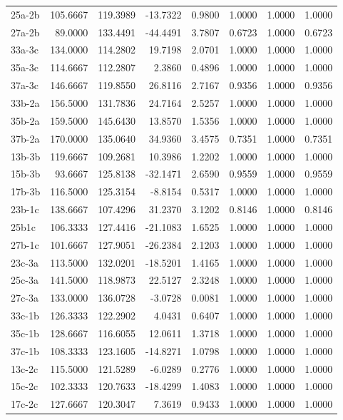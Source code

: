 \begin{table}
\begin{tabular}{lrrrrrrr}
25a-2b & 105.6667 & 119.3989 & -13.7322 & 0.9800 & 1.0000 & 1.0000 & 1.0000 \\
27a-2b & 89.0000 & 133.4491 & -44.4491 & 3.7807 & 0.6723 & 1.0000 & 0.6723 \\
33a-3c & 134.0000 & 114.2802 & 19.7198 & 2.0701 & 1.0000 & 1.0000 & 1.0000 \\
35a-3c & 114.6667 & 112.2807 & 2.3860 & 0.4896 & 1.0000 & 1.0000 & 1.0000 \\
37a-3c & 146.6667 & 119.8550 & 26.8116 & 2.7167 & 0.9356 & 1.0000 & 0.9356 \\
33b-2a & 156.5000 & 131.7836 & 24.7164 & 2.5257 & 1.0000 & 1.0000 & 1.0000 \\
35b-2a & 159.5000 & 145.6430 & 13.8570 & 1.5356 & 1.0000 & 1.0000 & 1.0000 \\
37b-2a & 170.0000 & 135.0640 & 34.9360 & 3.4575 & 0.7351 & 1.0000 & 0.7351 \\
13b-3b & 119.6667 & 109.2681 & 10.3986 & 1.2202 & 1.0000 & 1.0000 & 1.0000 \\
15b-3b & 93.6667 & 125.8138 & -32.1471 & 2.6590 & 0.9559 & 1.0000 & 0.9559 \\
17b-3b & 116.5000 & 125.3154 & -8.8154 & 0.5317 & 1.0000 & 1.0000 & 1.0000 \\
23b-1c & 138.6667 & 107.4296 & 31.2370 & 3.1202 & 0.8146 & 1.0000 & 0.8146 \\
25b1c & 106.3333 & 127.4416 & -21.1083 & 1.6525 & 1.0000 & 1.0000 & 1.0000 \\
27b-1c & 101.6667 & 127.9051 & -26.2384 & 2.1203 & 1.0000 & 1.0000 & 1.0000 \\
23c-3a & 113.5000 & 132.0201 & -18.5201 & 1.4165 & 1.0000 & 1.0000 & 1.0000 \\
25c-3a & 141.5000 & 118.9873 & 22.5127 & 2.3248 & 1.0000 & 1.0000 & 1.0000 \\
27c-3a & 133.0000 & 136.0728 & -3.0728 & 0.0081 & 1.0000 & 1.0000 & 1.0000 \\
33c-1b & 126.3333 & 122.2902 & 4.0431 & 0.6407 & 1.0000 & 1.0000 & 1.0000 \\
35c-1b & 128.6667 & 116.6055 & 12.0611 & 1.3718 & 1.0000 & 1.0000 & 1.0000 \\
37c-1b & 108.3333 & 123.1605 & -14.8271 & 1.0798 & 1.0000 & 1.0000 & 1.0000 \\
13c-2c & 115.5000 & 121.5289 & -6.0289 & 0.2776 & 1.0000 & 1.0000 & 1.0000 \\
15c-2c & 102.3333 & 120.7633 & -18.4299 & 1.4083 & 1.0000 & 1.0000 & 1.0000 \\
17c-2c & 127.6667 & 120.3047 & 7.3619 & 0.9433 & 1.0000 & 1.0000 & 1.0000 \\
\bottomrule
\end{tabular}
\end{table}
